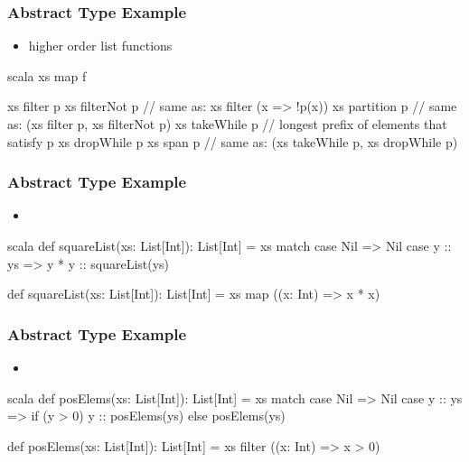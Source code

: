 \documentclass[dvipsnames]{beamer}
\theoremstyle{plain}
\begin{document}
\begin{frame}[fragile]
  \frametitle{Abstract Type Example}

  \begin{example}
    \begin{itemize}
      \item higher order list functions
    \end{itemize}

    \begin{pygments}{scala}
xs map f

xs filter p
xs filterNot p  // same as: xs filter (x => !p(x))
xs partition p  // same as: (xs filter p, xs filterNot p)
xs takeWhile p  // longest prefix of elements that satisfy p
xs dropWhile p
xs span p       // same as: (xs takeWhile p, xs dropWhile p)
    \end{pygments}
  \end{example}
\end{frame}

\begin{frame}[fragile]
  \frametitle{Abstract Type Example}

  \begin{example}
    \begin{itemize}
      \item {}
    \end{itemize}

    \pause
    \begin{pygments}{scala}
def squareList(xs: List[Int]): List[Int] =
    xs match {
        case Nil => Nil
        case y :: ys => y * y :: squareList(ys)
    }

def squareList(xs: List[Int]): List[Int] =
    xs map ((x: Int) => x * x)
    \end{pygments}
  \end{example}
\end{frame}

\begin{frame}[fragile]
  \frametitle{Abstract Type Example}

  \begin{example}
    \begin{itemize}
      \item {}
    \end{itemize}

    \pause
    \begin{pygments}{scala}
def posElems(xs: List[Int]): List[Int] =
    xs match {
        case Nil => Nil
        case y :: ys => if (y > 0) y :: posElems(ys)
                        else posElems(ys)
    }

def posElems(xs: List[Int]): List[Int] =
    xs filter ((x: Int) => x > 0)
    \end{pygments}
  \end{example}
\end{frame}
\end{document}
